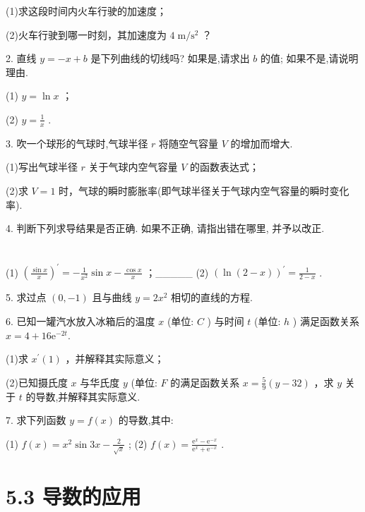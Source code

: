 \documentclass[10pt]{article}
\begin{document}
(1)求这段时间内火车行驶的加速度；

(2)火车行驶到哪一时刻，其加速度为 \(4\mathrm{\;m}/{\mathrm{s}}^{2}\) ？

2. 直线 \(y =  - x + b\) 是下列曲线的切线吗? 如果是,请求出 \(b\) 的值; 如果不是,请说明理由.

(1) \(y = \ln x\) ；

(2) \(y = \frac{1}{x}\) .

3. 吹一个球形的气球时,气球半径 \(r\) 将随空气容量 \(V\) 的增加而增大.

(1)写出气球半径 \(r\) 关于气球内空气容量 \(V\) 的函数表达式；

(2)求 \(V = 1\) 时，气球的瞬时膨胀率(即气球半径关于气球内空气容量的瞬时变化率).

4. 判断下列求导结果是否正确. 如果不正确, 请指出错在哪里, 并予以改正.

\section*{}

\section*{}

(1) \({\left( \frac{\sin x}{x}\right) }^{\prime } =  - \frac{1}{{x}^{2}}\sin x - \frac{\cos x}{x}\) ；\_\_\_\_\_ (2) \({\left( \ln \left( 2 - x\right) \right) }^{\prime } = \frac{1}{2 - x}\) .

5. 求过点 \(\left( {0, - 1}\right)\) 且与曲线 \(y = 2{x}^{2}\) 相切的直线的方程.

6. 已知一罐汽水放入冰箱后的温度 \(x\) (单位: \(C\) ) 与时间 \(t\) (单位: \(h\) ) 满足函数关系 \(x = 4 + {16}{\mathrm{e}}^{-{2t}}.\)

(1)求 \({x}^{\prime }\left( 1\right)\) ，并解释其实际意义；

(2)已知摄氏度 \(x\) 与华氏度 \(y\) (单位: \(F\) 的满足函数关系 \(x = \frac{5}{9}\left( {y - {32}}\right)\) ，求 \(y\) 关于 \(t\) 的导数,并解释其实际意义.

7. 求下列函数 \(y = f\left( x\right)\) 的导数,其中:

(1) \(f\left( x\right)  = {x}^{2}\sin {3x} - \frac{2}{\sqrt{x}}\) ; (2) \(f\left( x\right)  = \frac{{\mathrm{e}}^{x} - {\mathrm{e}}^{-x}}{{\mathrm{e}}^{x} + {\mathrm{e}}^{-x}}\) .



\section*{5.3 导数的应用}
\end{document}
